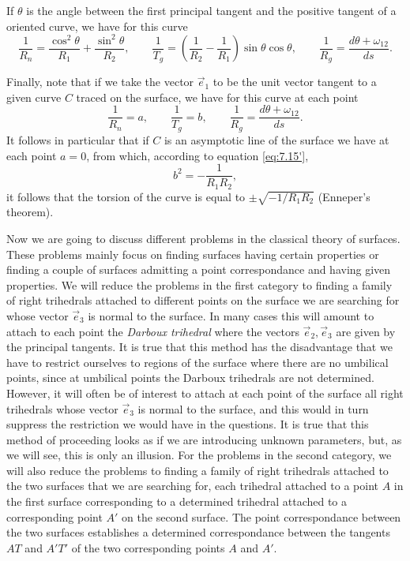 \documentclass[leqno,11pt]{book}
\numberwithin{equation}{chapter}
\theoremstyle{shape1}
\theoremstyle{shape0}
\theoremstyle{shape2}
\theoremstyle{definition}
\begin{document}
If $\theta$ is the angle between the first principal tangent and the positive tangent of a oriented curve, we have for this curve
\begin{equation}
  \label{eq:7.17}
  \frac{1}{R_{n}}=\frac{\cos^{2}\theta}{R_{1}}+\frac{\sin^{2}\theta}{R_{2}},\qquad\frac{1}{T_{g}}=\left(\frac{1}{R_{2}}-\frac{1}{R_{1}}\right)\sin\theta\cos\theta,\qquad\frac{1}{R_{g}}=\frac{d\theta+\omega_{12}}{ds}.
\end{equation}

Finally, note that if we take the vector $\vec e_{1}$ to be the unit vector tangent to a given curve $C$ traced on the surface, we have for this curve at each point
\begin{equation}
  \label{eq:7.18}
  \frac{1}{R_{n}}=a,\qquad\frac{1}{T_{g}}=b,\qquad\frac{1}{R_{g}}=\frac{d\theta+\omega_{12}}{ds}.
\end{equation}
It follows in particular that if $C$ is an asymptotic line of the surface we have at each point $a=0$, from which, according to equation \eqref{eq:7.15'},
\[
b^{2}=-\frac{1}{R_{1}R_{2}},
\]
it follows that the torsion of the curve is equal to $\pm\sqrt{-1/R_{1}R_{2}}$ (Enneper's theorem).


\vspace{12pt}\fsec Now we are going to discuss different problems in the classical theory of surfaces. These problems mainly focus on finding surfaces having certain properties or finding a couple of surfaces admitting a point correspondance and having given properties. We will reduce the problems in the first category to finding a family of right trihedrals attached to different points on the surface we are searching for whose vector $\vec e_{3}$ is normal to the surface. In many cases this will amount to attach to each point the \emph{Darboux trihedral} where the vectors $\vec e_{2},\vec e_{3}$ are given by the principal tangents. It is true that this method has the disadvantage that we have to restrict ourselves to regions of the surface where there are no umbilical points, since at umbilical points the Darboux trihedrals are not determined. However, it will often be of interest to attach at each point of the surface all right trihedrals whose vector $\vec e_{3}$ is normal to the surface, and this would in turn suppress the restriction we would have in the questions. It is true that this method of proceeding looks as if we are introducing unknown parameters, but, as we will see, this is only an illusion. For the problems in the second category, we will also reduce the problems to finding a family of right trihedrals attached to the two surfaces that we are searching for, each trihedral attached to a point $A$ in the first surface corresponding to a determined trihedral attached to a corresponding point $A'$ on the second surface. The point correspondance  between the two surfaces establishes a determined correspondance between the tangents $AT$ and $A'T'$ of the two corresponding points $A$ and $A'$.
\end{document}
